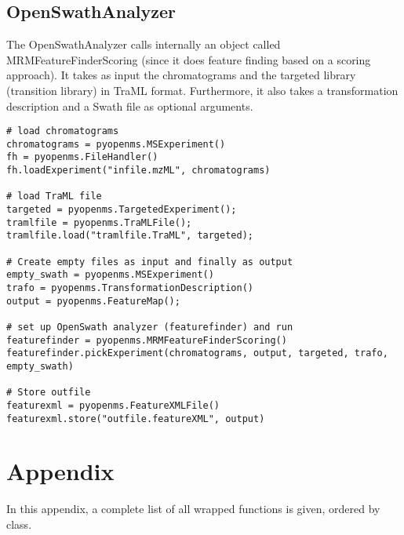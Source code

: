 \documentclass[10pt]{article}
\begin{document}
\subsection{OpenSwathAnalyzer}

The OpenSwathAnalyzer calls internally an object called
MRMFeatureFinderScoring (since it does feature finding based on a scoring
approach). It takes as input the chromatograms and the targeted library
(transition library) in TraML format. Furthermore, it also takes a
transformation description and a Swath file as optional arguments.

\begin{verbatim}
# load chromatograms
chromatograms = pyopenms.MSExperiment()
fh = pyopenms.FileHandler()
fh.loadExperiment("infile.mzML", chromatograms)

# load TraML file
targeted = pyopenms.TargetedExperiment();
tramlfile = pyopenms.TraMLFile();
tramlfile.load("tramlfile.TraML", targeted);

# Create empty files as input and finally as output
empty_swath = pyopenms.MSExperiment()
trafo = pyopenms.TransformationDescription()
output = pyopenms.FeatureMap();

# set up OpenSwath analyzer (featurefinder) and run
featurefinder = pyopenms.MRMFeatureFinderScoring()
featurefinder.pickExperiment(chromatograms, output, targeted, trafo, empty_swath)

# Store outfile
featurexml = pyopenms.FeatureXMLFile()
featurexml.store("outfile.featureXML", output)
\end{verbatim}

\section{Appendix}
In this appendix, a complete list of all wrapped functions is given, ordered
by class.


\end{document}
